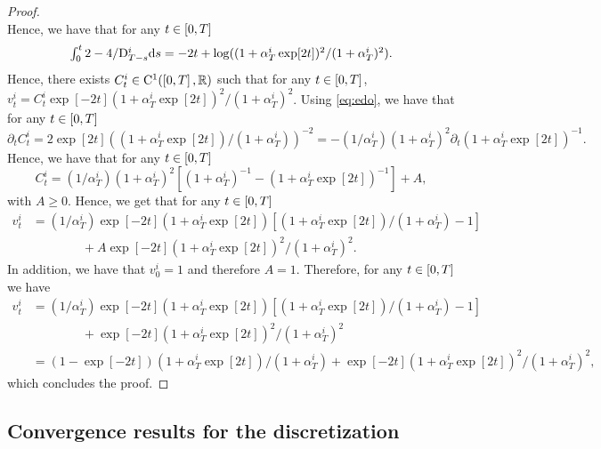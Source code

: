 \begin{proof}
\begin{equation}
    \end{equation}
    Hence, we have that for any $t \in \left[0,T\right]$
    \begin{equation}
      \textstyle{
        \int_0^t 2 - 4 / \mathrm{D}_{T-s}^i \mathrm{d}s = -2t + \log((1 + \alpha_T^i \exp[2t])^2/(1 + \alpha_T^i )^2) .
        }
      \end{equation}
      Hence, there exists $C_t^i \in \mathrm{C}^1(\left[0,T\right], \mathbb{R})$ such that for
      any $t \in \left[0,T\right]$, $v_t^i = C_t^i \exp[-2t](1 + \alpha_T^i \exp[2t])^2/(1 + \alpha_T^i )^2$.
      Using \eqref{eq:edo}, we have that for any $t \in \left[0,T\right]$
      \begin{equation}
        \partial_t C_t^i = 2 \exp[2t] ((1 + \alpha_T^i \exp[2t])/(1 + \alpha_T^i))^{-2} = -(1/\alpha_T^i)(1+\alpha_T^i)^2 \partial_t (1 + \alpha_T^i \exp[2t])^{-1}.
      \end{equation}
      Hence, we have that for any $t \in \left[0,T\right]$
      \begin{equation}
        C_t^i = (1/\alpha_T^i)(1+\alpha_T^i)^2 [ (1 + \alpha_T^i)^{-1} - (1 + \alpha_T^i \exp[2t])^{-1}  ] + A ,
      \end{equation}
      with $A \geq 0$. Hence, we get that for any $t \in \left[0,T\right]$
      \begin{align}
        v_t^i &= (1/\alpha_T^i) \exp[-2t] (1 + \alpha_T^i \exp[2t]) [ (1 + \alpha_T^i \exp[2t])/(1 + \alpha_T^i) - 1 ] \\
        & \qquad \qquad + A \exp[-2t](1 + \alpha_T^i \exp[2t])^2/(1 + \alpha_T^i )^2 .
      \end{align}
      In addition, we have that $v_0^i=1$ and therefore $A=1$. Therefore, for any $t \in \left[0,T\right]$ we have
      \begin{align}
        v_t^i &= (1/\alpha_T^i) \exp[-2t] (1 + \alpha_T^i \exp[2t]) [ (1 + \alpha_T^i \exp[2t])/(1 + \alpha_T^i) - 1 ] \\
              & \qquad \qquad + \exp[-2t](1 + \alpha_T^i \exp[2t])^2/(1 + \alpha_T^i )^2 \\
         &=  (1 - \exp[-2t]) (1 + \alpha_T^i \exp[2t]) /(1 + \alpha_T^i)  + \exp[-2t](1 + \alpha_T^i \exp[2t])^2/(1 + \alpha_T^i )^2 ,      
      \end{align}
      which concludes the proof.
    \end{proof}

    \subsection{Convergence results for the discretization}
\label{sec:conv-results-discr}

